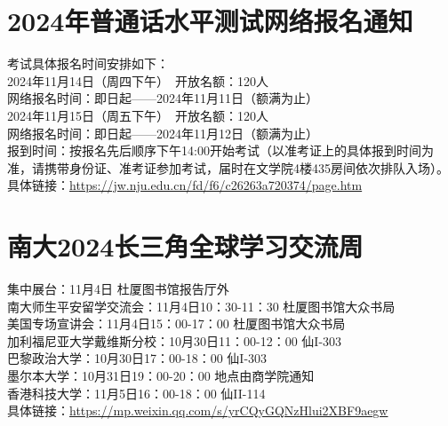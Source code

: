 \documentclass[letterpaper, 12pt]{article}
\begin{document}
\begin{multicols}{2}
\section{2024年普通话水平测试网络报名通知}
考试具体报名时间安排如下：\\
2024年11月14日（周四下午） 开放名额：120人\\
网络报名时间：即日起——2024年11月11日（额满为止）\\
2024年11月15日（周五下午） 开放名额：120人\\
网络报名时间：即日起——2024年11月12日（额满为止）\\
报到时间：按报名先后顺序下午14:00开始考试（以准考证上的具体报到时间为准，请携带身份证、准考证参加考试，届时在文学院4楼435房间依次排队入场）。 \\
具体链接：\url{https://jw.nju.edu.cn/fd/f6/c26263a720374/page.htm}\\




\section{南大2024长三角全球学习交流周}
集中展台：11月4日 杜厦图书馆报告厅外\\
南大师生平安留学交流会：11月4日10：30-11：30 杜厦图书馆大众书局\\
美国专场宣讲会：11月4日15：00-17：00 杜厦图书馆大众书局\\
加利福尼亚大学戴维斯分校：10月30日11：00-12：00 仙I-303\\
巴黎政治大学：10月30日17：00-18：00 仙I-303\\
墨尔本大学：10月31日19：00-20：00 地点由商学院通知\\
香港科技大学：11月5日16：00-18：00 仙II-114\\
具体链接：\url{https://mp.weixin.qq.com/s/yrCQyGQNzHlui2XBF9aegw}\\



\end{multicols}
\end{document}
